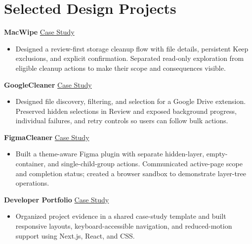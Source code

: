 \documentclass[10pt,letterpaper]{article}
\begin{document}
\section*{Selected Design Projects}
\textbf{MacWipe} \hfill \href{https://juliana-portfolio-two.vercel.app/work/macwipe}{Case Study}
\begin{itemize}
\item Designed a review-first storage cleanup flow with file details, persistent Keep exclusions, and explicit confirmation. Separated read-only exploration from eligible cleanup actions to make their scope and consequences visible.
\end{itemize}
\textbf{GoogleCleaner} \hfill \href{https://juliana-portfolio-two.vercel.app/work/googlecleaner}{Case Study}
\begin{itemize}
\item Designed file discovery, filtering, and selection for a Google Drive extension. Preserved hidden selections in Review and exposed background progress, individual failures, and retry controls so users can follow bulk actions.
\end{itemize}
\textbf{FigmaCleaner} \hfill \href{https://juliana-portfolio-two.vercel.app/work/figmacleaner}{Case Study}
\begin{itemize}
\item Built a theme-aware Figma plugin with separate hidden-layer, empty-container, and single-child-group actions. Communicated active-page scope and completion status; created a browser sandbox to demonstrate layer-tree operations.
\end{itemize}
\textbf{Developer Portfolio} \hfill \href{https://juliana-portfolio-two.vercel.app/work/portfolio}{Case Study}
\begin{itemize}
\item Organized project evidence in a shared case-study template and built responsive layouts, keyboard-accessible navigation, and reduced-motion support using Next.js, React, and CSS.
\end{itemize}
\end{document}
